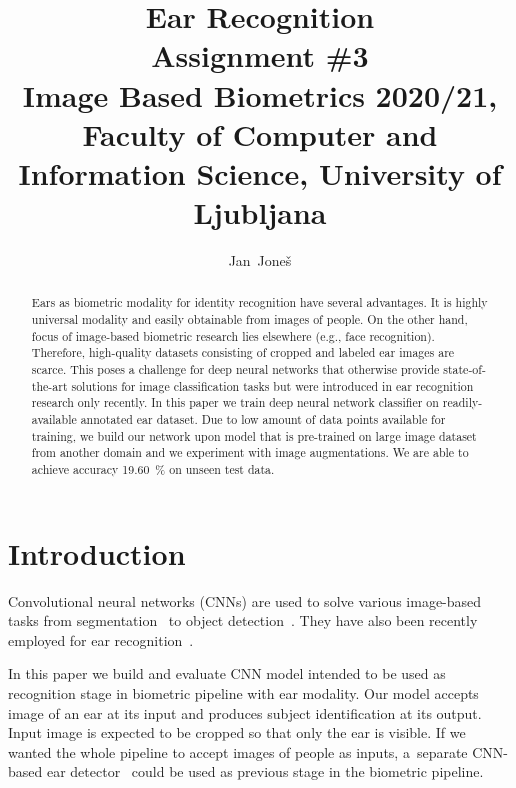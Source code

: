 \documentclass[9pt]{IEEEtran}
\title{\vspace{0ex} %
Ear Recognition
\\ \large{Assignment \#3}\\ \normalsize{Image Based Biometrics 2020/21, Faculty of Computer and Information Science, University of Ljubljana}}
\author{ %
Jan~Joneš
\vspace{-4.0ex}
}
\begin{document}
\maketitle

\begin{abstract}
    Ears as biometric modality for identity recognition have several advantages.
    It is highly universal modality and easily obtainable from images of people.
    On the other hand, focus of image-based biometric research lies elsewhere (e.g., face recognition).
    Therefore, high-quality datasets consisting of cropped and labeled ear images are scarce.
    This poses a challenge for deep neural networks that otherwise provide state-of-the-art solutions for image classification tasks but were introduced in ear recognition research only recently.
    In this paper we train deep neural network classifier on readily-available annotated ear dataset.
    Due to low amount of data points available for training, we build our network upon model that is pre-trained on large image dataset from another domain and we experiment with image augmentations.
    We are able to achieve accuracy 19.60~\% on unseen test data.
\end{abstract}

\section{Introduction}

Convolutional neural networks (CNNs) are used to solve various image-based tasks from segmentation~\cite{chen2014semantic} to object detection~\cite{tan2020efficientdet}.
They have also been recently employed for ear recognition~\cite{emersic2017,dodge2018,emersic2019,eyiokur2017,zhang2018}.

In this paper we build and evaluate CNN model intended to be used as recognition stage in biometric pipeline with ear modality.
Our model accepts image of an ear at its input and produces subject identification at its output.
Input image is expected to be cropped so that only the ear is visible.
If we wanted the whole pipeline to accept images of people as inputs, a~separate CNN-based ear detector~\cite{emersic2018} could be used as previous stage in the biometric pipeline.
\end{document}
